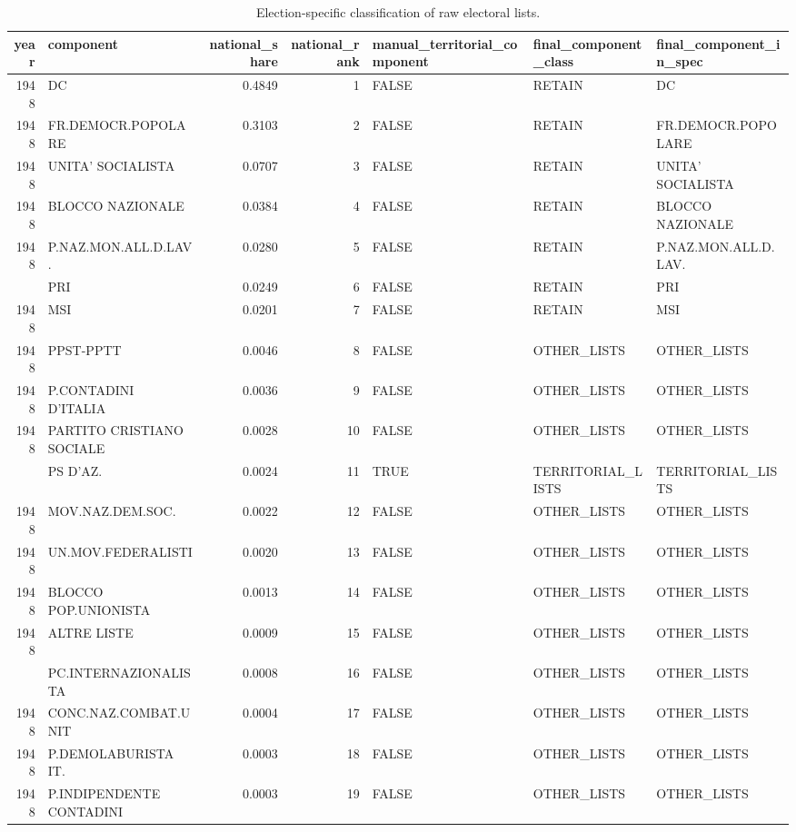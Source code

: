 
\begin{longtable}[t]{rlrrlll}
\caption{\label{tab:app_component_classification}Election-specific classification of raw electoral lists.}\\
\toprule
year & component & national\_share & national\_rank & manual\_territorial\_component & final\_component\_class & final\_component\_in\_spec\\
\midrule
1948 & DC & 0.4849 & 1 & FALSE & RETAIN & DC\\
1948 & FR.DEMOCR.POPOLARE & 0.3103 & 2 & FALSE & RETAIN & FR.DEMOCR.POPOLARE\\
1948 & UNITA' SOCIALISTA & 0.0707 & 3 & FALSE & RETAIN & UNITA' SOCIALISTA\\
1948 & BLOCCO NAZIONALE & 0.0384 & 4 & FALSE & RETAIN & BLOCCO NAZIONALE\\
1948 & P.NAZ.MON.ALL.D.LAV. & 0.0280 & 5 & FALSE & RETAIN & P.NAZ.MON.ALL.D.LAV.\\
\addlinespace
1948 & PRI & 0.0249 & 6 & FALSE & RETAIN & PRI\\
1948 & MSI & 0.0201 & 7 & FALSE & RETAIN & MSI\\
1948 & PPST-PPTT & 0.0046 & 8 & FALSE & OTHER\_LISTS & OTHER\_LISTS\\
1948 & P.CONTADINI D'ITALIA & 0.0036 & 9 & FALSE & OTHER\_LISTS & OTHER\_LISTS\\
1948 & PARTITO CRISTIANO SOCIALE & 0.0028 & 10 & FALSE & OTHER\_LISTS & OTHER\_LISTS\\
\addlinespace
1948 & PS D'AZ. & 0.0024 & 11 & TRUE & TERRITORIAL\_LISTS & TERRITORIAL\_LISTS\\
1948 & MOV.NAZ.DEM.SOC. & 0.0022 & 12 & FALSE & OTHER\_LISTS & OTHER\_LISTS\\
1948 & UN.MOV.FEDERALISTI & 0.0020 & 13 & FALSE & OTHER\_LISTS & OTHER\_LISTS\\
1948 & BLOCCO POP.UNIONISTA & 0.0013 & 14 & FALSE & OTHER\_LISTS & OTHER\_LISTS\\
1948 & ALTRE LISTE & 0.0009 & 15 & FALSE & OTHER\_LISTS & OTHER\_LISTS\\
\addlinespace
1948 & PC.INTERNAZIONALISTA & 0.0008 & 16 & FALSE & OTHER\_LISTS & OTHER\_LISTS\\
1948 & CONC.NAZ.COMBAT.UNIT & 0.0004 & 17 & FALSE & OTHER\_LISTS & OTHER\_LISTS\\
1948 & P.DEMOLABURISTA IT. & 0.0003 & 18 & FALSE & OTHER\_LISTS & OTHER\_LISTS\\
1948 & P.INDIPENDENTE CONTADINI & 0.0003 & 19 & FALSE & OTHER\_LISTS & OTHER\_LISTS\\

\end{longtable}
